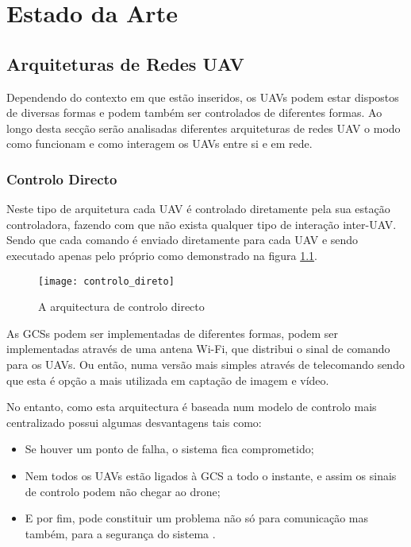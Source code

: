 \chapter{Estado da Arte} \label{chap:sota}

\section{Arquiteturas de Redes UAV}\label{sec:architectures}

Dependendo do contexto em que estão inseridos, os UAVs podem estar dispostos de diversas formas e podem também ser controlados de diferentes formas. Ao longo desta secção serão analisadas diferentes arquiteturas de redes UAV o modo como funcionam e como interagem os UAVs entre si e em rede.

\subsection{Controlo Directo}
Neste tipo de arquitetura cada UAV é controlado diretamente pela sua estação controladora, fazendo com que não exista qualquer tipo de interação inter-UAV. Sendo que cada comando é enviado diretamente para cada UAV e sendo executado apenas pelo próprio como demonstrado na figura \ref{fig:controlo_directo}.

\begin{figure}[H]
\centering
\texttt{[image: controlo\_direto]}
\caption{A arquitectura de controlo directo \label{fig:controlo_directo}}
\end{figure}

As GCSs podem ser implementadas de diferentes formas, podem ser implementadas através de uma antena Wi-Fi, que distribui o sinal de comando para os UAVs. Ou então, numa versão mais simples através de telecomando sendo que esta é opção a mais utilizada em captação de imagem e vídeo.

No entanto, como esta arquitectura é baseada num modelo de controlo mais centralizado possui algumas desvantagens tais como: 

\begin{itemize}
\item Se houver um ponto de falha, o sistema fica comprometido;
\item Nem todos os UAVs estão ligados à GCS a todo o instante, e assim os sinais de controlo podem não chegar ao drone;
\item E por fim, pode constituir um problema não só para comunicação mas também, para a segurança do sistema \cite{ImadJawhar2017}.
\end{itemize}

